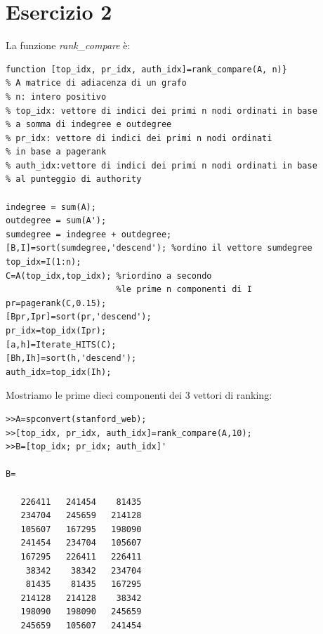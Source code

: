 \documentclass[11pt,a4paper,twoside,openright,titlepage,
                           headinclude,footinclude,BCOR5mm,
                           numbers=noenddot,cleardoublepage=empty,
                           tablecaptionabove]{scrbook}
\begin{document}
\section{Esercizio 2}
La funzione \emph{rank\_compare} è:
\begin{lstlisting}[frame=trBL]
function [top_idx, pr_idx, auth_idx]=rank_compare(A, n)}
% A matrice di adiacenza di un grafo
% n: intero positivo
% top_idx: vettore di indici dei primi n nodi ordinati in base
% a somma di indegree e outdegree
% pr_idx: vettore di indici dei primi n nodi ordinati
% in base a pagerank
% auth_idx:vettore di indici dei primi n nodi ordinati in base
% al punteggio di authority

indegree = sum(A);
outdegree = sum(A');
sumdegree = indegree + outdegree;
[B,I]=sort(sumdegree,'descend'); %ordino il vettore sumdegree
top_idx=I(1:n);
C=A(top_idx,top_idx); %riordino a secondo 
                      %le prime n componenti di I
pr=pagerank(C,0.15);
[Bpr,Ipr]=sort(pr,'descend');
pr_idx=top_idx(Ipr);
[a,h]=Iterate_HITS(C);
[Bh,Ih]=sort(h,'descend');
auth_idx=top_idx(Ih);
\end{lstlisting}
Mostriamo le prime dieci componenti dei 3 vettori di ranking:
\begin{lstlisting}[frame=trBL]
>>A=spconvert(stanford_web);
>>[top_idx, pr_idx, auth_idx]=rank_compare(A,10);
>>B=[top_idx; pr_idx; auth_idx]'

B=

   226411   241454    81435
   234704   245659   214128
   105607   167295   198090
   241454   234704   105607
   167295   226411   226411
    38342    38342   234704
    81435    81435   167295
   214128   214128    38342
   198090   198090   245659
   245659   105607   241454
\end{lstlisting}
\end{document}
